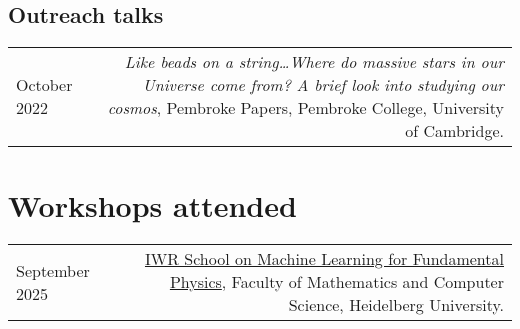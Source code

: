 \documentclass{article}
\begin{document}
\subsection*{Outreach talks}
\begin{longtable}{L!{\vrule}R}

  October 2022 & \textit{Like beads on a string\ldots Where do massive stars in our Universe come from? A brief look into studying our cosmos}, Pembroke Papers, Pembroke College, University of Cambridge. \\

\end{longtable}

\begin{comment}
\section*{Posters Presentations}

\begin{longtable}{L!{\vrule}R}
	March 2021 & \href{https://github.com/htjb/Talks/blob/master/Posters/SKA_globalemu_March_2021/globalemu.pdf}{\textit{globalemu: A novel and robust approach for emulating the sky averaged 21-cm signal from the cosmic dawn and epoch of reionization}}, A Precursor View of the SKA Sky, Virtual Conference\\
	December 2019 & \href{https://drive.google.com/file/d/1dvgumyu4cXxXqoYxikU3DKOa4u_gpGzn/view}{\textit{REACH: Radio Experiment for the Analysis of Cosmic Hydrogen}}, Science At Low Frequencies VI, Arizona State University \\
	November 2019 & \href{https://github.com/htjb/Talks/blob/master/Posters/Cav_Graduate_Conf_REACH_Nov_2019/REACH_poster.pdf}{\textit{REACH: Radio Experiment for the Analysis of Cosmic Hydrogen}}, Cavendish Graduate Conference, University of Cambridge
\end{longtable}
\end{comment}

\section*{Workshops attended}
\begin{longtable}{L!{\vrule}R}
    September 2025 & \href{https://indico.physi.uni-heidelberg.de/event/1053/}{IWR School on Machine Learning for Fundamental Physics}, Faculty of Mathematics and Computer Science, Heidelberg University. \\

\end{longtable}
\end{document}
